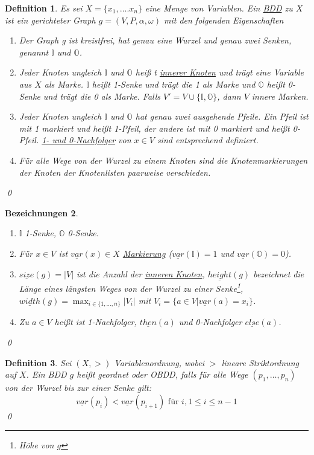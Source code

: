 \documentclass[ngerman]{scrartcl}
\theoremstyle{custom}
\newtheorem{mdef}{Definition} \numberwithin{mdef}{subsection}
\newtheorem{mbez}[mdef]{Bezeichnungen}
\newcommand{\0}{\mathbf{0}}
\newcommand{\1}{\mathbf{L}}
\begin{document}
\begin{mdef}
Es sei $X = \{x_1, \dots. x_n\}$ eine Menge von Variablen. Ein
\underline{BDD} zu $X$ ist ein gerichteter Graph $g =
(V,P,\alpha,\omega)$ mit den folgenden Eigenschaften
\begin{enumerate}
\item[(1)] Der Graph g ist kreistfrei, hat genau eine Wurzel und genau
  zwei Senken, genannt $\mathds{I}$ und $\mathds{O}$.
\item[(2)] Jeder Knoten ungleich $\mathds{I}$ und $\mathds{O}$ hei\ss
  t \underline{innerer Knoten} und tr\"agt eine Variable aus $X$ als
  Marke. $\mathds{I}$ hei\ss t 1-Senke und tr\"agt die 1 als Marke und
  $\mathds{O}$ hei\ss t 0-Senke und tr\"agt die 0 als Marke. Falls $V'
  = V \cup \{\mathds{I}, \mathds{O}\}$, dann $V$ innere Marken.
\item[(3)] Jeder Knoten ungleich 
$\mathds{I}$ und $\mathds{O}$ hat
  genau zwei ausgehende Pfeile. Ein Pfeil ist mit 1 markiert und
  hei\ss t 1-Pfeil, der andere ist mit 0 markiert und hei\ss t
  0-Pfeil. \underline{1- und 0-Nachfolger} von $x \in V$ sind entsprechend definiert.
\item[(4)] F\"ur alle Wege von der Wurzel zu einem Knoten sind die
  Knotenmarkierungen der Knoten der Knotenlisten paarweise
  verschieden.
\end{enumerate}
\qed
\end{mdef}

\begin{mbez}
\begin{enumerate}
\item[(1)] $\mathds{I}$ 1-Senke, $\mathds{O}$ 0-Senke.
\item[(2)] F\"ur $x \in V$ ist $\underline{var}(x) \in X$
  \underline{Markierung} ($\underline{var}(\mathds{I})=1$ und
  $\underline{var}(\mathds{O})=0$).
\item[(3)] $\underline{size}(g)=\vert V \vert$ ist die Anzahl der
  \underline{inneren Knoten}, $\underline{height}(g)$ bezeichnet die
  L\"ange eines l\"angsten Weges von der Wurzel zu einer
  Senke\footnote{H\"ohe von $g$}, $\underline{width}(g)= \max_{i \in
    \{1,\dots,n\}} \vert V_i \vert$ mit $V_i = \{ a \in V \vert
  \underline{var}(a)=x_i\}$.
\item[(4)]  Zu $a \in V$ hei\ss t ist 1-Nachfolger,
  $\underline{then}(a)$ und 0-Nachfolger $\underline{else}(a)$.
\end{enumerate}
\qed
\end{mbez}

\begin{mdef}
Sei $(X,>)$ Variablenordnung, wobei $>$ lineare Striktordnung auf
$X$. Ein BDD $g$ hei\ss t geordnet oder OBDD, falls f\"ur alle Wege $(p_1,\dots,p_n)$ 
von der Wurzel bis zur einer Senke gilt:
\begin{equation*}
\underline{var}(p_i) < \underline{var}(p_{i+1}) \text{ f\"ur } i, 1
\leq i \leq n-1
\end{equation*}
\qed
\end{mdef}
\end{document}
